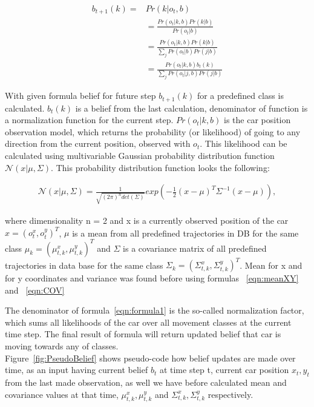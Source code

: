 \begin{equation}
\begin{split}
b_{t+1}(k) = & \displaystyle Pr(k|o_{t}, b) \\ 
& = \displaystyle \frac{Pr(o_{t}|k, b) Pr(k|b)}{Pr(o_{t}|b)} \\
& = \displaystyle \frac{Pr(o_{t}|k, b) Pr(k|b)}{ \sum_{j} Pr(o_{t}|b) Pr(j|b)} \\
& = \displaystyle \frac{Pr(o_{t}|k, b) b_{t}(k)}{ \sum_{j} Pr(o_{t}|j, b) Pr(j|b)}
\end{split}
\label{eqn:formula1}
\end{equation}

With given formula belief for future step $b_{t+1}(k)$ for a predefined class is calculated. $b_{t}(k)$ is a belief from the last calculation, denominator of function is a normalization function for the current step. $Pr(o_{t} | k, b)$ is the car position observation model, which returns the probability (or likelihood) of going to any direction from the current position, observed with $o_{t}$. This likelihood can be calculated using multivariable Gaussian probability distribution function $\mathcal{N}(x|\mu,\Sigma)$. This probability distribution function looks the following:

\begin{equation}
\begin{split}
\mathcal{N}(x|\mu,\Sigma) = \displaystyle \frac{1}{\sqrt{(2 \pi)^n det(\Sigma)}} exp(-\frac{1}{2}(x-\mu)^T\Sigma^{-1}(x-\mu)), 
\end{split}
\label{eqn:formula2}
\end{equation}

where dimensionality n = 2 and x is a currently observed position of the car $x = (o_t^x, o_t^y)^T$, $\mu$ is a mean from all predefined trajectories in \gls{DB} for the same class $\mu_k  = (\mu_{t,k}^x, \mu_{t,k}^y)^T$ and $\Sigma$ is a covariance matrix of all predefined trajectories in data base for the same class $\Sigma_k  = (\Sigma_{t,k}^x, \Sigma_{t,k}^y)^T$. Mean for x and for y coordinates and variance was found before using formulas ~\ref{eqn:meanXY} and ~\ref{eqn:COV}

The denominator of formula~\ref{eqn:formula1} is the so-called normalization factor, which sums all likelihoods of the car over all movement classes at the current time step. The final result of formula will return updated belief that car is moving towards any of classes. \\
Figure~\ref{fig:PseudoBelief} shows pseudo-code how belief updates are made over time, as an input having current belief $b_t$ at time step t, current car position $x_t, y_t$ from the last made observation, as well we have before calculated mean and covariance values at that time, $\mu_{t,k}^x, \mu_{t,k}^y$ and $\Sigma_{t,k}^x, \Sigma_{t,k}^y$ respectively.

